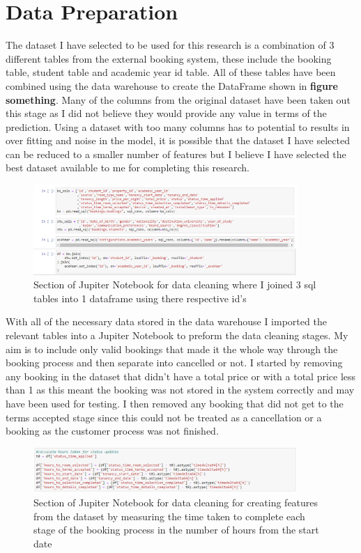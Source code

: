 \section{Data Preparation}

The dataset I have selected to be used for this research is a combination of 3 different tables from the external booking system, these include the booking table, student table and academic year id table. All of these tables have been combined using the data warehouse to create the DataFrame shown in \textbf{figure something}. Many of the columns from the original dataset have been taken out this stage as I did not believe they would provide any value in terms of the prediction. Using a dataset with too many columns has to potential to results in over fitting and noise in the model, it is possible that the dataset I have selected can be reduced to a smaller number of features but I believe I have selected the best dataset available to me for completing this research. 

\begin{figure}[hbt!]
 \includegraphics[width=10cm]{figures/joining_tables.png}
 \caption{Section of Jupiter Notebook for data cleaning where I joined 3 sql tables into 1 dataframe using there respective id's}
\end{figure}

With all of the necessary data stored in the data warehouse I imported the relevant tables into a Jupiter Notebook to preform the data cleaning stages. My aim is to include only valid bookings that made it the whole way through the booking process and then separate into cancelled or not. I started by removing any booking in the dataset that didn't have a total price or with a total price less than 1 as this meant the booking was not stored in the system correctly and may have been used for testing. I then removed any booking that did not get to the terms accepted stage since this could not be treated as a cancellation or a booking as the customer process was not finished.

\begin{figure}[hbt!]
 \includegraphics[width=10cm]{figures/time_variables.png}
 \caption{Section of Jupiter Notebook for data cleaning for creating features from the dataset by measuring the time taken to complete each stage of the booking process in the number of hours from the start date}
\end{figure}

